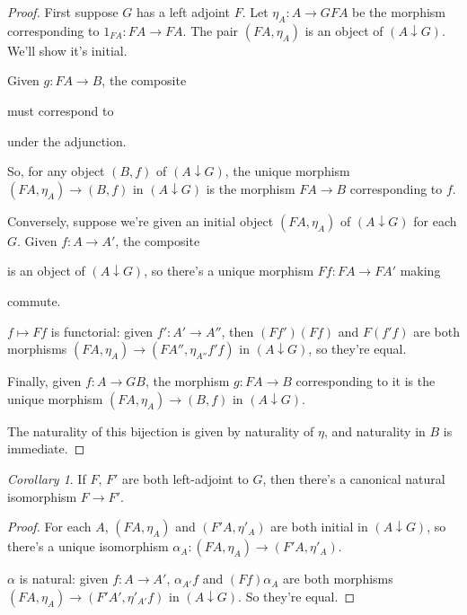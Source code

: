 \documentclass[a4paper]{article}
\theoremstyle{definition}
\theoremstyle{remark}
\theoremstyle{default}
\newtheorem{corollary}[definition]{Corollary}
\numberwithin{definition}{section}
\begin{document}
\begin{proof}
	First suppose $G$ has a left adjoint $F$.
	Let $\eta_A: A \to GFA$ be the morphism corresponding to $1_{FA}:FA \to FA$.
	The pair $(FA, \eta_A)$ is an object of $(A \downarrow G)$.
	We'll show it's initial.
	
	Given $g: FA \to B$,
	the composite
	must correspond to
	under the adjunction.
	
	So, for any object $(B, f)$ of $(A \downarrow G)$,
	the unique morphism $(FA, \eta_A) \to (B, f)$ in $(A \downarrow G)$ is the morphism $FA \to B$ corresponding to $f$.
	
	Conversely, suppose we're given an initial object $(FA, \eta_A)$ of $(A \downarrow G)$ for each $G$.
	Given $f: A \to A'$,
	the composite
	is an object of $(A \downarrow G)$,
	so there's a unique morphism $Ff: FA \to FA'$ making
	\begin{center}
	\end{center}
	commute.
	
	$f \mapsto Ff$ is functorial:
	given $f': A' \to A''$,
	then $(Ff')(Ff)$ and $F(f'f)$ are both morphisms $(FA, \eta_A) \to (FA'', \eta_{A''}f'f)$ in $(A \downarrow G)$,
	so they're equal.
	
	Finally, given $f: A \to GB$,
	the morphism $g: FA \to B$ corresponding to it is the unique morphism $(FA, \eta_A) \to (B, f)$ in $(A \downarrow G)$.
	
	The naturality of this bijection is given by naturality of $\eta$,
	and naturality in $B$ is immediate.
\end{proof}

\begin{corollary}
	If $F,\, F'$ are both left-adjoint to $G$,
	then there's a canonical natural isomorphism $F \to F'$.
\end{corollary}
\begin{proof}
	For each $A$,
	$(FA, \eta_A)$ and $(F'A, \eta'_A)$ are both initial in $(A \downarrow G)$,
	so there's a unique isomorphism $\alpha_A: (FA, \eta_A) \to (F'A, \eta'_A)$.
	
	$\alpha$ is natural: given $f: A \to A'$,
	$\alpha_{A'}f$ and $(Ff)\alpha_A$ are both morphisms $(FA, \eta_A) \to (F'A', \eta'_{A'}f)$ in $(A \downarrow G)$.
	So they're equal.
\end{proof}
\end{document}
